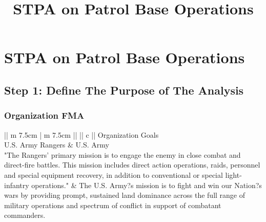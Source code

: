 \documentclass[../../main/main.tex]{subfiles}
\begin{document}
\title{STPA on Patrol Base Operations}

\chapter{STPA on Patrol Base Operations}\label{chp:stpapb}


\section{Step 1: Define The Purpose of The Analysis}\label{chp:stpapb:purpose}
\subsection{Organization FMA}

\begin{table}[h!]
\parskip=8pt
\begin{tabular}{||  m {7.5cm}  |  m {7.5cm}  ||}
\hline
{} {|| c ||} {Organization Goals} \\
 \hline
U.S. Army Rangers	& U.S. Army\\
\hline
"The Rangers' primary mission is to engage the enemy in close combat and direct-fire battles. This mission includes direct action operations, raids, personnel and special equipment recovery, in addition to conventional or special light-infantry operations."
&	
The U.S. Army?s mission is to fight and win our Nation?s wars by providing prompt, sustained land dominance across the full range of military operations and spectrum of conflict in support of combatant commanders.\\
\hline
\end{tabular}
\caption{Organization goals.}
\label{orgo}
\end{table}
\clearpage
\end{document}
